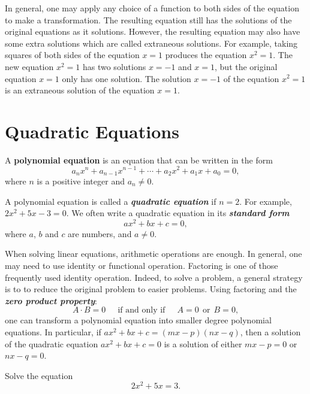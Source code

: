 \documentclass[en,12pt]{elegantbook}
\newenvironment{rmdnote}{
    \par\noindent
    \makebox[-\width][r]{
    \tiny\color{red!90}
    \textdbend
    \hspace*{2pt}
    }
    \makebox[\width][l]{
        \hspace*{3pt}
        \textbf{
            \color{second}
            Note 
        }
    }
    \begin{shaded}
    \itshape
}{
    \par
    \end{shaded}
}
\let\BeginKnitrBlock\begin \let\EndKnitrBlock\end
\begin{document}
\begin{rmdnote}

In general, one may apply any choice of a function to both sides of the equation to make a transformation. The resulting equation still has the solutions of the original equations as it solutions. However, the resulting equation may also have some extra solutions which are called extraneous solutions. For example, taking squares of both sides of the equation \(x=1\) produces the equation \(x^2=1\). The new equation \(x^2=1\) has two solutions \(x=-1\) and \(x=1\), but the original equation \(x=1\) only has one solution. The solution \(x=-1\) of the equation \(x^2=1\) is an extraneous solution of the equation \(x=1\).

\end{rmdnote}

\hypertarget{quadratic-equations}{%
\section{Quadratic Equations}\label{quadratic-equations}}

A \textbf{polynomial equation} is an equation that can be written in the form
\[
a_{n}x^{n}+a_{n-1}x^{n-1}+\cdots+a_{2}x^{2}+a_{1}x+a_{0}=0,
\]
where \(n\) is a positive integer and \(a_n\ne 0\).

A polynomial equation is called a \textbf{\emph{quadratic equation}} if \(n=2\). For example, \(2x^2+5x-3=0\). We often write a quadratic equation in its \textbf{\emph{standard form}}
\[a x^2+bx+c=0,\]
where \(a\), \(b\) and \(c\) are numbers, and \(a\neq 0\).

When solving linear equations, arithmetic operations are enough. In general, one may need to use identity or functional operation. Factoring is one of those frequently used identity operation. Indeed, to solve a problem, a general strategy is to to reduce the original problem to easier problems. Using factoring and the \textbf{\emph{zero product property}}:
\[A\cdot B=0 \quad ~~\text{if and only if}~~  \quad A=0 ~~\text{or}~~ B=0,\]
one can transform a polynomial equation into smaller degree polynomial equations. In particular, if \(ax^2+bx+c=(mx-p)(nx-q)\), then a solution of the quadratic equation \(ax^2+bx+c=0\) is a solution of either \(mx-p=0\) or \(nx-q=0\).

\BeginKnitrBlock{example}
\protect\hypertarget{exm:unnamed-chunk-111}{}{\label{exm:unnamed-chunk-111} }
Solve the equation
\[2x^2+5x=3.\]
\EndKnitrBlock{example}
\end{document}
